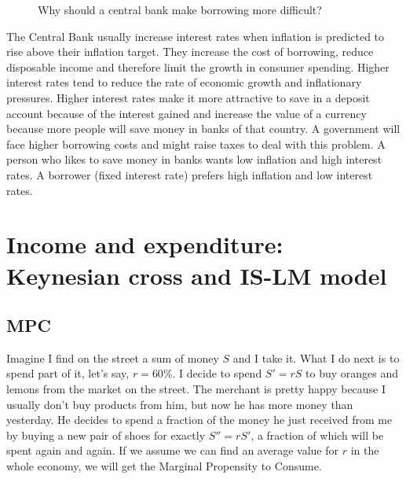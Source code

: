 \begin{figure}
    \caption{Why should a central bank make borrowing more difficult?}
    \label{fig:high_rates}
\end{figure}

The Central Bank usually increase interest rates when inflation is predicted to rise above their inflation target. They increase the cost of borrowing, reduce disposable income and therefore limit the growth in consumer spending. Higher interest rates tend to reduce the rate of economic growth and inflationary pressures. Higher interest rates make it more attractive to save in a deposit account because of the interest gained and increase the value of a currency because more people will save money in banks of that country. A government will face higher borrowing costs and might raise taxes to deal with this problem. A person who likes to save money in banks wants low inflation and high interest rates. A borrower (fixed interest rate) prefers high inflation and low interest rates.

\section{Income and expenditure: Keynesian cross and IS-LM model}

\subsection{MPC}
Imagine I find on the street a sum of money $S$ and I take it. What I do next is to spend part of it, let's say, $r = 60\%$. I decide to spend $S' = rS$ to buy oranges and lemons from the market on the street. The merchant is pretty happy because I usually don't buy products from him, but now he has more money than yesterday. He decides to spend a fraction of the money he just received from me by buying a new pair of shoes for exactly $S'' = rS'$, a fraction of which will be spent again and again. If we assume we can find an average value for $r$ in the whole economy, we will get the Marginal Propensity to Consume.


